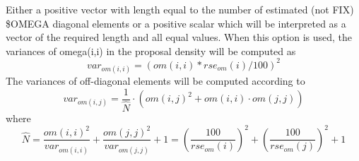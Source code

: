 \begin{optionlist}
Either a positive vector with length equal to the number of estimated (not FIX) \$OMEGA 
diagonal elements or a positive scalar which will be interpreted as a vector of the required 
length and all equal values. When this option is used, the variances of omega(i,i) in the 
proposal density will be computed as 
\[
var_{om(i,i)}=\left(om(i,i)*rse_{om}(i)/100\right)^2
\]
The variances of off-diagonal elements will be computed according to
\[
var_{om(i,j)}= \frac{1}{\hat{N}} \cdot \left(om(i,j)^2 + om(i,i)\cdot om(j,j) \right)
\]
where
\[
\hat{N} = \frac{om(i,i)^2}{var_{om(i,i)}}+\frac{om(j,j)^2}{var_{om(j,j)}}+1 =\left(\frac{100}{rse_{om}(i)}\right)^2+\left(\frac{100}{rse_{om}(j)}\right)^2+1
\]


\end{optionlist}
